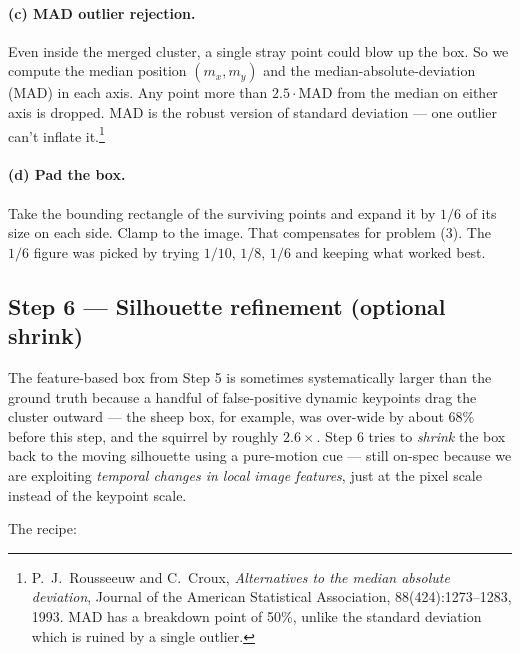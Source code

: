 \documentclass[11pt,a4paper]{article}
\begin{document}
\paragraph{(c) MAD outlier rejection.} Even inside the merged
cluster, a single stray point could blow up the box. So we compute
the median position $(m_x, m_y)$ and the median-absolute-deviation
(MAD) in each axis. Any point more than $2.5\cdot\text{MAD}$ from the
median on either axis is dropped. MAD is the robust version of
standard deviation --- one outlier can't inflate
it.\footnote{P.~J.~Rousseeuw and C.~Croux, \emph{Alternatives to the
median absolute deviation}, Journal of the American Statistical
Association, 88(424):1273--1283, 1993. MAD has a breakdown point of
50\%, unlike the standard deviation which is ruined by a single
outlier.}

\paragraph{(d) Pad the box.} Take the bounding rectangle of the
surviving points and expand it by $1/6$ of its size on each side.
Clamp to the image. That compensates for problem (3). The $1/6$
figure was picked by trying $1/10$, $1/8$, $1/6$ and keeping what
worked best.

\subsection{Step 6 --- Silhouette refinement (optional shrink)}

The feature-based box from Step 5 is sometimes systematically larger
than the ground truth because a handful of false-positive dynamic
keypoints drag the cluster outward --- the sheep box, for example,
was over-wide by about $68\%$ before this step, and the squirrel by
roughly $2.6\times$. Step 6 tries to \emph{shrink} the box back to
the moving silhouette using a pure-motion cue --- still on-spec
because we are exploiting \emph{temporal changes in local image
features}, just at the pixel scale instead of the keypoint scale.

The recipe:
\end{document}
